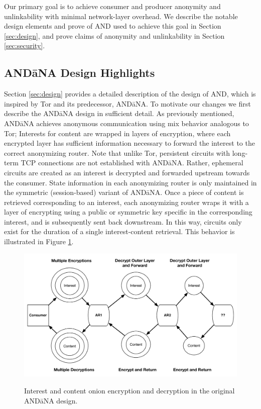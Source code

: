Our primary goal is to achieve consumer and producer anonymity and unlinkability with minimal network-layer overhead. We describe the notable design elements and prove of {\sf AND} used to achieve this goal in Section \ref{sec:design}, and prove claims of anonymity and unlinkability in Section \ref{sec:security}.

\subsection{AND\=aNA Design Highlights}
Section \ref{sec:design} provides a detailed description of the design of {\sf AND}, which is inspired by Tor and its predecessor, {\sf AND\=aNA}. To motivate our changes we first describe the {\sf AND\=aNA} design in sufficient detail. As previously mentioned, {\sf AND\=aNA} achieves anonymous communication using mix behavior analogous to Tor; Interests for content are wrapped in layers of encryption, where each encrypted layer has sufficient information necessary to forward the interest to the correct anonymizing router. Note that unlike Tor, persistent circuits with long-term TCP connections are not established with {\sf AND\=aNA}. Rather, ephemeral circuits are created as an interest is decrypted and forwarded upstream towards the consumer. State information in each anonymizing router is only maintained in the symmetric (session-based) variant of {\sf AND\=aNA}. Once a piece of content is retrieved corresponding to an interest, each anonymizing router wraps it with a layer of encrypting using a public or symmetric key specific in the corresponding interest, and is subsequently sent back downstream. In this way, circuits only exist for the duration of a single interest-content retrieval. This behavior is illustrated in Figure \ref{fig:andanav1_design}.

\begin{figure}
\begin{center}
\includegraphics[scale=0.34]{./images/andana_v1_design.pdf}
\label{fig:andanav1_design}
\caption{Interest and content onion encryption and decryption in the original {\sf AND\=aNA} design.}
\end{center}
\end{figure}

